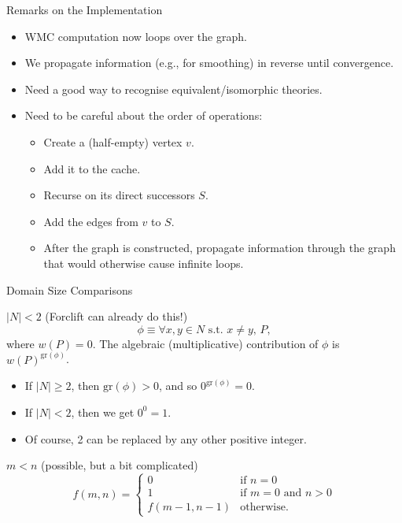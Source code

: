 \documentclass{beamer}
\begin{document}
\begin{frame}{Remarks on the Implementation}
  \begin{itemize}
  \item WMC computation now loops over the graph.
  \item We propagate information (e.g., for smoothing) in reverse until convergence.
  \item Need a good way to recognise equivalent/isomorphic theories.
  \item Need to be careful about the order of operations:
    \begin{itemize}
    \item Create a (half-empty) vertex $v$.
    \item Add it to the cache.
    \item Recurse on its direct successors $S$.
    \item Add the edges from $v$ to $S$.
    \item After the graph is constructed, propagate information through the
      graph that would otherwise cause infinite loops.
    \end{itemize}
  \end{itemize}
\end{frame}

\begin{frame}{Domain Size Comparisons}
  \begin{block}{$|N| < 2$ (Forclift can already do this!)}
    \[
    \phi \equiv \forall x, y \in N \text{ s.t. } x \ne y\text{, } P,
    \]
    where $w(P) = 0$. The algebraic (multiplicative) contribution of $\phi$ is $w(P)^{\mathrm{gr}(\phi)}$.
    \begin{itemize}
    \item If $|N| \ge 2$, then $\mathrm{gr}(\phi) > 0$, and so $0^{\mathrm{gr}(\phi)} = 0$.
    \item If $|N| < 2$, then we get $0^0 = 1$.
    \item Of course, 2 can be replaced by any other positive integer.
    \end{itemize}
  \end{block}
  \pause
  \begin{block}{$m < n$ (possible, but a bit complicated)}
    \[
    f(m, n) = \begin{cases}
      0 & \text{if } n = 0 \\
      1 & \text{if } m = 0 \text{ and } n > 0 \\
      f(m-1, n-1) & \text{otherwise.}
    \end{cases}
    \]
  \end{block}
\end{frame}
\end{document}
